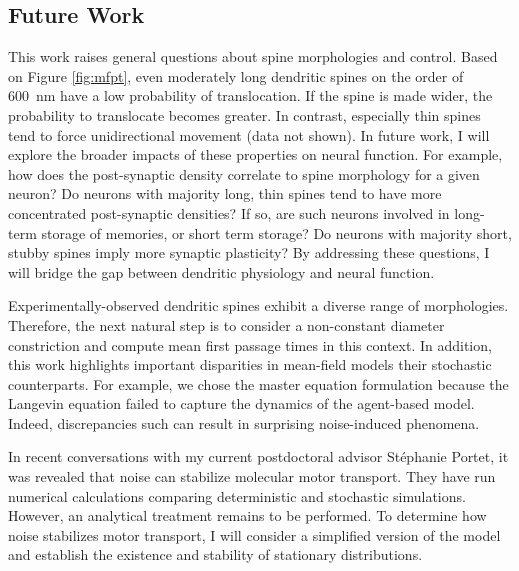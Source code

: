 \documentclass[a4paper,11pt]{article}
\begin{document}
	\subsection{Future Work}
	This work raises general questions about spine morphologies and control. Based on Figure \ref{fig:mfpt}, even moderately long dendritic spines on the order of \SI{600}{\nm} have a low probability of translocation. If the spine is made wider, the probability to translocate becomes greater. In contrast, especially thin spines tend to force unidirectional movement (data not shown). In future work, I will explore the broader impacts of these properties on neural function. For example, how does the post-synaptic density correlate to spine morphology for a given neuron? Do neurons with majority long, thin spines tend to have more concentrated post-synaptic densities? If so, are such neurons involved in long-term storage of memories, or short term storage? Do neurons with majority short, stubby spines imply more synaptic plasticity? By addressing these questions, I will bridge the gap between dendritic physiology and neural function.
	
    Experimentally-observed dendritic spines exhibit a diverse range of morphologies. Therefore, the next natural step is to consider a non-constant diameter constriction and compute mean first passage times in this context. In addition, this work highlights important disparities in mean-field models their stochastic counterparts. For example, we chose the master equation formulation because the Langevin equation failed to capture the dynamics of the agent-based model. Indeed, discrepancies such can result in surprising noise-induced phenomena.
    
    
    In recent conversations with my current postdoctoral advisor St\'{e}phanie Portet, it was revealed that noise can stabilize molecular motor transport. They have run numerical calculations comparing deterministic and stochastic simulations. However, an analytical treatment remains to be performed. To determine how noise stabilizes motor transport, I will consider a simplified version of the model and establish the existence and stability of stationary distributions.
    
\end{document}
